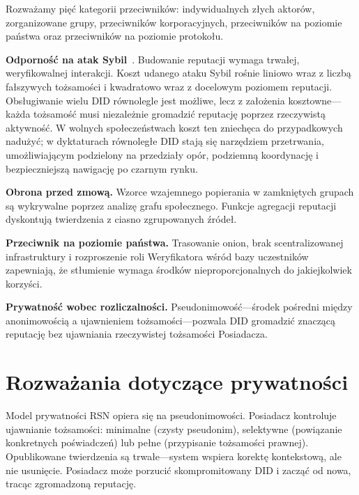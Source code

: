 \documentclass[11pt,a4paper,twocolumn]{article}
\begin{document}
Rozważamy pięć kategorii przeciwników: indywidualnych złych aktorów, zorganizowane grupy, przeciwników korporacyjnych, przeciwników na poziomie państwa oraz przeciwników na poziomie protokołu.

\textbf{Odporność na atak Sybil}~\cite{douceur2002}. Budowanie reputacji wymaga trwałej, weryfikowalnej interakcji. Koszt udanego ataku Sybil rośnie liniowo wraz z liczbą fałszywych tożsamości i kwadratowo wraz z docelowym poziomem reputacji. Obsługiwanie wielu DID równolegle jest możliwe, lecz z założenia kosztowne---każda tożsamość musi niezależnie gromadzić reputację poprzez rzeczywistą aktywność. W wolnych społeczeństwach koszt ten zniechęca do przypadkowych nadużyć; w dyktaturach równoległe DID stają się narzędziem przetrwania, umożliwiającym podzielony na przedziały opór, podziemną koordynację i bezpieczniejszą nawigację po czarnym rynku.

\textbf{Obrona przed zmową.} Wzorce wzajemnego popierania w zamkniętych grupach są wykrywalne poprzez analizę grafu społecznego. Funkcje agregacji reputacji dyskontują twierdzenia z ciasno zgrupowanych źródeł.

\textbf{Przeciwnik na poziomie państwa.} Trasowanie onion, brak scentralizowanej infrastruktury i rozproszenie roli Weryfikatora wśród bazy uczestników zapewniają, że stłumienie wymaga środków nieproporcjonalnych do jakiejkolwiek korzyści.

\textbf{Prywatność wobec rozliczalności.} Pseudonimowość---środek pośredni między anonimowością a ujawnieniem tożsamości---pozwala DID gromadzić znaczącą reputację bez ujawniania rzeczywistej tożsamości Posiadacza.

\section{Rozważania dotyczące prywatności}

Model prywatności RSN opiera się na pseudonimowości. Posiadacz kontroluje ujawnianie tożsamości: minimalne (czysty pseudonim), selektywne (powiązanie konkretnych poświadczeń) lub pełne (przypisanie tożsamości prawnej). Opublikowane twierdzenia są trwałe---system wspiera korektę kontekstową, ale nie usunięcie. Posiadacz może porzucić skompromitowany DID i zacząć od nowa, tracąc zgromadzoną reputację.

\end{document}
